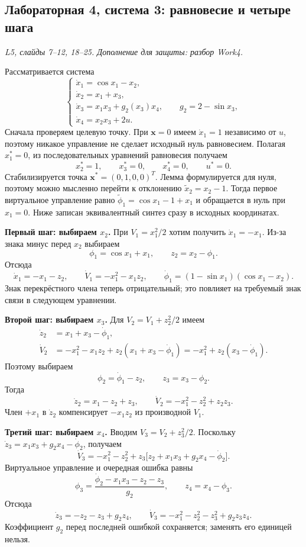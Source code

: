 \subsection{Лабораторная 4, система 3: равновесие и четыре шага}
\textit{L5, слайды 7--12, 18--25. Дополнение для защиты: разбор Work4.}

Рассматривается система
\[
  \begin{cases}
    \dot x_1=\cos x_1-x_2,\\
    \dot x_2=x_1+x_3,\\
    \dot x_3=x_1x_3+g_2(x_3)x_4,\qquad g_2=2-\sin x_3,\\
    \dot x_4=x_2x_3+2u.
  \end{cases}
\]
Сначала проверяем целевую точку. При $\bm x=0$ имеем
$\dot x_1=1$ независимо от $u$, поэтому никакое управление не сделает
исходный нуль равновесием. Полагая $x_1^*=0$, из последовательных
уравнений равновесия получаем
\[
  x_2^*=1,\qquad x_3^*=0,\qquad x_4^*=0,\qquad u^*=0.
\]
Стабилизируется точка $\bm x^*=(0,1,0,0)^T$.
Лемма формулируется для нуля, поэтому можно мысленно перейти к
отклонению $\widetilde x_2=x_2-1$. Тогда первое виртуальное управление
равно $\widetilde\phi_1=\cos x_1-1+x_1$ и обращается в нуль при
$x_1=0$. Ниже записан эквивалентный синтез сразу в исходных координатах.

\textbf{Первый шаг: выбираем $x_2$.}
При $V_1=x_1^2/2$ хотим получить $\dot x_1=-x_1$. Из-за знака
минус перед $x_2$ выбираем
\[
  \phi_1=\cos x_1+x_1,\qquad z_2=x_2-\phi_1.
\]
Отсюда
\[
  \dot x_1=-x_1-z_2,\qquad
  \dot V_1=-x_1^2-x_1z_2,\qquad
  \dot\phi_1=(1-\sin x_1)(\cos x_1-x_2).
\]
Знак перекрёстного члена теперь отрицательный; это повлияет
на требуемый знак связи в следующем уравнении.

\textbf{Второй шаг: выбираем $x_3$.}
Для $V_2=V_1+z_2^2/2$ имеем
\begin{align*}
  \dot z_2&=x_1+x_3-\dot\phi_1,\\
  \dot V_2&=-x_1^2-x_1z_2
          +z_2(x_1+x_3-\dot\phi_1)
           =-x_1^2+z_2(x_3-\dot\phi_1).
\end{align*}
Поэтому выбираем
\[
  \phi_2=\dot\phi_1-z_2,\qquad z_3=x_3-\phi_2.
\]
Тогда
\[
  \dot z_2=x_1-z_2+z_3,\qquad
  \dot V_2=-x_1^2-z_2^2+z_2z_3.
\]
Член $+x_1$ в $\dot z_2$ компенсирует $-x_1z_2$
из производной $V_1$.

\textbf{Третий шаг: выбираем $x_4$.}
Вводим $V_3=V_2+z_3^2/2$. Поскольку
$\dot z_3=x_1x_3+g_2x_4-\dot\phi_2$, получаем
\[
  \dot V_3=-x_1^2-z_2^2+
    z_3\bigl[z_2+x_1x_3+g_2x_4-\dot\phi_2\bigr].
\]
Виртуальное управление и очередная ошибка равны
\[
  \phi_3=\frac{\dot\phi_2-x_1x_3-z_2-z_3}{g_2},
  \qquad z_4=x_4-\phi_3.
\]
Отсюда
\[
  \dot z_3=-z_2-z_3+g_2z_4,\qquad
  \dot V_3=-x_1^2-z_2^2-z_3^2+g_2z_3z_4.
\]
Коэффициент $g_2$ перед последней ошибкой сохраняется; заменять его
единицей нельзя.

